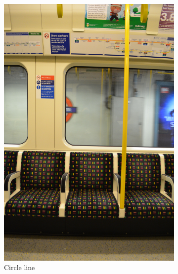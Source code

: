 \begin{figure}[H]
    \centering
    \begin{subfigure}[b]{0.22\textwidth}
        \centering
        \includegraphics[width=\textwidth]{guidance/images/rathbone2017circle.jpg}
        \caption{Circle line \parencite{rathbone2017circle}}
        \label{fig:rathbone2017circle}
    \end{subfigure}
    \hfill
    \begin{subfigure}[b]{0.22\textwidth}
        \centering

\end{subfigure}
\end{figure}
